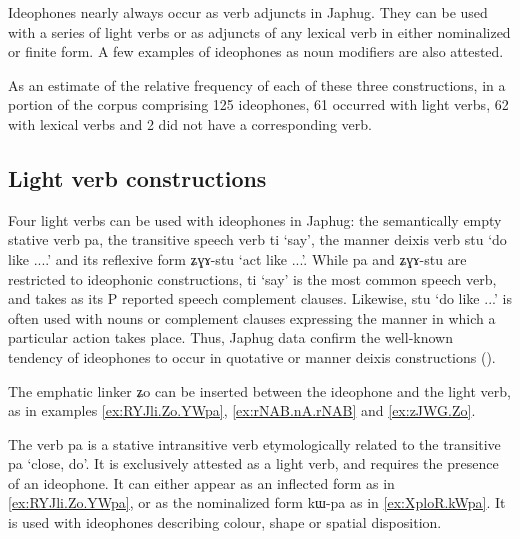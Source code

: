 \documentclass[oldfontcommands,oneside,a4paper,11pt]{article}
\newcommand{\ipa}[1]{{\phon \mbox{#1}}} %
\begin{document}
Ideophones nearly always occur as verb adjuncts in Japhug. They can be used with a series of light verbs or as adjuncts of any lexical verb in either nominalized or finite form. A few examples of ideophones as noun modifiers are also attested.

As an estimate of the relative frequency of each of these three constructions, in a portion of the corpus comprising 125 ideophones, 61 occurred with light verbs, 62 with lexical verbs and 2 did not have a corresponding verb.

\subsection{Light verb constructions} \label{sec:ideophone.plus.light.verb}
 
Four light verbs can be used with ideophones in Japhug: the semantically empty stative verb \ipa{pa}, the transitive speech verb \ipa{ti} `say', the manner deixis verb \ipa{stu} `do like ....' and its reflexive form \ipa{ʑɣɤ-stu} `act like ...'.   While \ipa{pa} and \ipa{ʑɣɤ-stu} are restricted to ideophonic constructions, \ipa{ti} `say'  is the most common speech verb, and takes as its P reported speech complement clauses. Likewise,  \ipa{stu} `do like ...' is often used with nouns or complement clauses expressing the manner in which a particular action takes place. Thus, Japhug data confirm the  well-known tendency of ideophones to occur in quotative or manner deixis constructions (\citet[280-8]{guldemann08quot}).

The emphatic linker \ipa{ʑo} can be inserted between the ideophone and the light verb, as in examples \ref{ex:RYJli.Zo.YWpa}, \ref{ex:rNAB.nA.rNAB} and \ref{ex:zJWG.Zo}.  


The verb \ipa{pa} is a stative intransitive verb etymologically related to the transitive \ipa{pa} `close, do'. It is exclusively attested as a light verb, and requires the presence of an ideophone.  It can either appear as an inflected form as in \ref{ex:RYJli.Zo.YWpa}, or as the nominalized form \ipa{kɯ-pa} as in \ref{ex:XploR.kWpa}. It is used with ideophones describing   colour, shape or spatial disposition.
 
\end{document}
